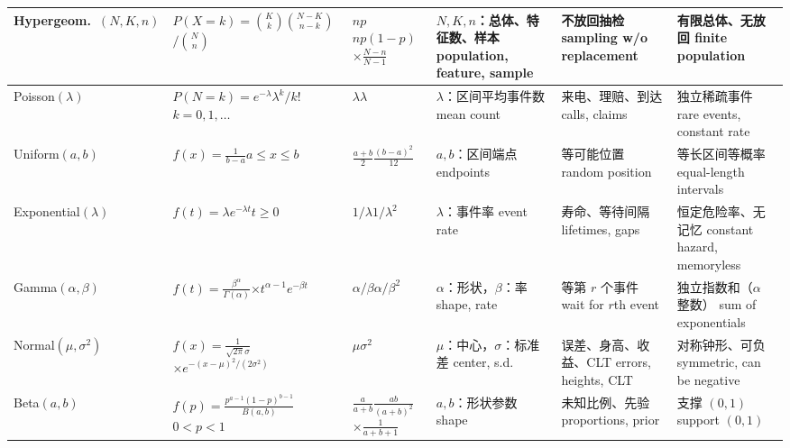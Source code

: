 \documentclass[UTF8,11pt,a4paper]{ctexart}
\begin{document}
{\begin{longtable}{p{2.2cm}p{3.8cm}p{2.15cm}p{2.35cm}p{2.7cm}p{2.45cm}}
\hline
Hypergeom.\ $(N,K,n)$ & $P(X=k)=\binom Kk\binom{N-K}{n-k}$\newline $\big/\binom Nn$ & $np$\newline $np(1-p)$\newline $\times\frac{N-n}{N-1}$ & $N,K,n$：总体、特征数、样本 population, feature, sample & 不放回抽检 sampling w/o replacement & 有限总体、无放回 finite population \\
\hline
Poisson$(\lambda)$ & $P(N=k)=e^{-\lambda}\lambda^k/k!$\newline $k=0,1,\ldots$ & $\lambda$\newline $\lambda$ & $\lambda$：区间平均事件数 mean count & 来电、理赔、到达 calls, claims & 独立稀疏事件 rare events, constant rate \\
\hline
Uniform$(a,b)$ & $f(x)=\frac{1}{b-a}$\newline $a\le x\le b$ & $\frac{a+b}{2}$\newline $\frac{(b-a)^2}{12}$ & $a,b$：区间端点 endpoints & 等可能位置 random position & 等长区间等概率 equal-length intervals \\
\hline
Exponential\newline$(\lambda)$ & $f(t)=\lambda e^{-\lambda t}$\newline $t\ge0$ & $1/\lambda$\newline $1/\lambda^2$ & $\lambda$：事件率 event rate & 寿命、等待间隔 lifetimes, gaps & 恒定危险率、无记忆 constant hazard, memoryless \\
\hline
Gamma$(\alpha,\beta)$ & $f(t)=\frac{\beta^\alpha}{\Gamma(\alpha)}$\newline $\times t^{\alpha-1}e^{-\beta t}$ & $\alpha/\beta$\newline $\alpha/\beta^2$ & $\alpha$：形状，$\beta$：率 shape, rate & 等第 $r$ 个事件 wait for $r$th event & 独立指数和（$\alpha$ 整数） sum of exponentials \\
\hline
Normal\newline$(\mu,\sigma^2)$ & $f(x)=\frac{1}{\sqrt{2\pi}\sigma}$\newline $\times e^{-(x-\mu)^2/(2\sigma^2)}$ & $\mu$\newline $\sigma^2$ & $\mu$：中心，$\sigma$：标准差 center, s.d. & 误差、身高、收益、CLT errors, heights, CLT & 对称钟形、可负 symmetric, can be negative \\
\hline
Beta$(a,b)$ & $f(p)=\frac{p^{a-1}(1-p)^{b-1}}{B(a,b)}$\newline $0<p<1$ & $\frac{a}{a+b}$\newline $\frac{ab}{(a+b)^2}$\newline $\times\frac{1}{a+b+1}$ & $a,b$：形状参数 shape & 未知比例、先验 proportions, prior & 支撑 $(0,1)$ support $(0,1)$ \\
\hline
\end{longtable}
}
\end{document}
